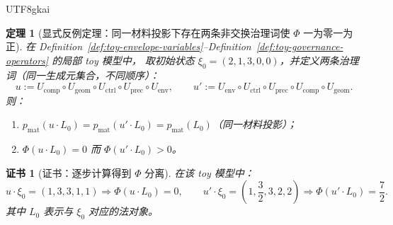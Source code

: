 \documentclass[12pt]{article}
\newtheorem{theorem}{定理}[section]
\newtheorem{certificate}{证书}[section]
\begin{document}
\begin{CJK*}{UTF8}{gkai}
\begin{theorem}[显式反例定理：同一材料投影下存在两条非交换治理词使 $\Phi$ 一为零一为正]
\label{thm:explicit-noncommutative-counterexample}
在 Definition~\ref{def:toy-envelope-variables}--Definition~\ref{def:toy-governance-operators} 的局部 toy 模型中，
取初始状态 $\xi_0=(2,1,3,0,0)$，并定义两条治理词（同一生成元集合，不同顺序）：
\[
u:=U_{\mathrm{comp}}\circ U_{\mathrm{geom}}\circ U_{\mathrm{ctrl}}\circ U_{\mathrm{prec}}\circ U_{\mathrm{env}},
\qquad
u':=U_{\mathrm{env}}\circ U_{\mathrm{ctrl}}\circ U_{\mathrm{prec}}\circ U_{\mathrm{comp}}\circ U_{\mathrm{geom}}.
\]
则：
\begin{enumerate}
  \item $p_{\mathrm{mat}}(u\cdot L_0)=p_{\mathrm{mat}}(u'\cdot L_0)=p_{\mathrm{mat}}(L_0)$（同一材料投影）；
  \item $\Phi(u\cdot L_0)=0$ 而 $\Phi(u'\cdot L_0)>0$。
\end{enumerate}
\end{theorem}

\begin{certificate}[证书：逐步计算得到 $\Phi$ 分离]
\label{cert:explicit-counterexample}
在该 toy 模型中：
\[
u\cdot \xi_0=(1,3,3,1,1)\Rightarrow \Phi(u\cdot L_0)=0,
\qquad
u'\cdot \xi_0=\left(1,\frac{3}{2},3,2,2\right)\Rightarrow \Phi(u'\cdot L_0)=\frac{7}{2}.
\]
其中 $L_0$ 表示与 $\xi_0$ 对应的法对象。
\end{certificate}


\end{CJK*}
\end{document}
